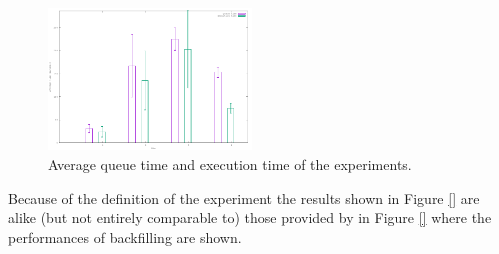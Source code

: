 \begin{figure}[!htb]
        \includegraphics[width=0.48\textwidth]{./figures/draft/AvgT.pdf}
    \caption{Average queue time and execution time of the experiments.}
\label{fig:avtTimes}
\end{figure}

Because of the definition of the experiment the results shown in Figure \ref{} are alike (but not entirely comparable to) those provided by in Figure \ref{} where the performances of backfilling are shown.









%
%
